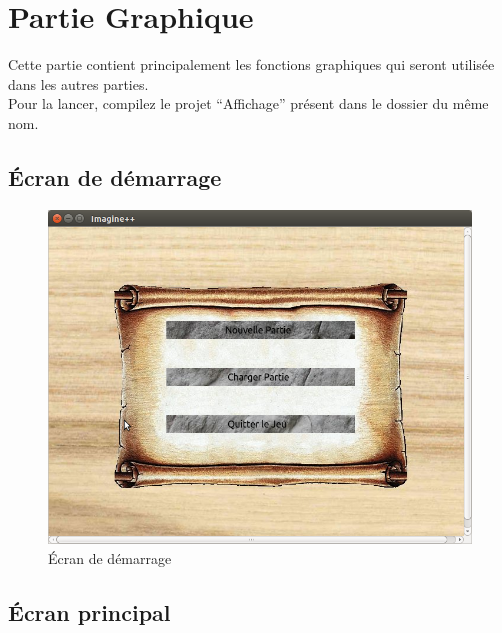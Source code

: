 \documentclass[11pt,a4paper]{article}
\begin{document}
\clearpage

\section{Partie Graphique}

Cette partie contient principalement les fonctions graphiques qui seront utilisée dans les autres parties. \\
Pour la lancer, compilez le projet ``Affichage'' présent dans le dossier du même nom.

\subsection{Écran de démarrage}

\begin{figure}[h]
\begin{center}
\includegraphics[scale=0.5]{./graphique_demarrage.png}
\caption{Écran de démarrage}
\end{center}
\end{figure}

\clearpage


\subsection{Écran principal}
\end{document}
